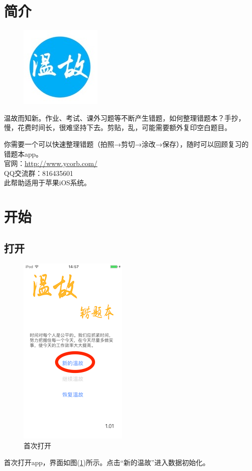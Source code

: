 \section{简介}

\begin{figure}[H]
\centering
\includegraphics{img/logo.jpg}
\end{figure}
温故而知新。作业、考试、课外习题等不断产生错题，如何整理错题本？手抄，慢，花费时间长，很难坚持下去。剪贴，乱，可能需要额外复印空白题目。

你需要一个可以快速整理错题（拍照→剪切→涂改→保存），随时可以回顾复习的错题本app。\\

官网：\url{http://www.ycorb.com/}\\

QQ交流群：816435601\\

此帮助适用于苹果iOS系统。


\section{开始}
\subsection{打开}
\begin{figure}[H]
	\centering
	\includegraphics{img/1.png}
	\caption{首次打开}
	\label{img1}
\end{figure}
首次打开app，界面如图(\ref{img1})所示。点击“新的温故”进入数据初始化。

